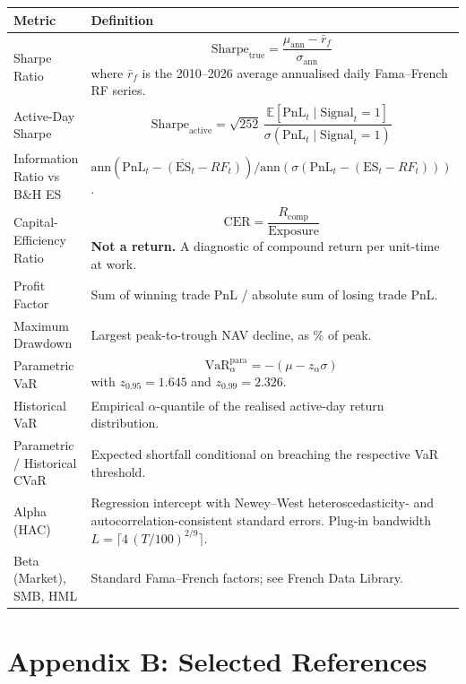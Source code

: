 \documentclass[11pt]{article}
\begin{document}
\begin{center}
\small
\begin{tabular}{p{} p{}}
\toprule
\textbf{Metric} & \textbf{Definition}\\
\midrule
Sharpe Ratio &
\[
\mathrm{Sharpe}_{\mathrm{true}}
= \frac{\mu_{\mathrm{ann}} - \bar r_f}{\sigma_{\mathrm{ann}}}
\]
where $\bar r_f$ is the 2010--2026 average annualised daily
Fama--French RF series.\\
Active-Day Sharpe &
\[
\mathrm{Sharpe}_{\mathrm{active}}
= \sqrt{252}\,
\frac{\mathbb{E}\!\left[\text{PnL}_t \mid \text{Signal}_t = 1\right]}
{\sigma\!\left(\text{PnL}_t \mid \text{Signal}_t = 1\right)}
\]\\
Information Ratio vs B\&H ES &
$\mathrm{ann}(\overline{\text{PnL}_t - (\text{ES}_t - RF_t)}) /
 \mathrm{ann}(\sigma(\text{PnL}_t - (\text{ES}_t - RF_t)))$.\\
Capital-Efficiency Ratio &
\[
\mathrm{CER} = \frac{R_{\mathrm{comp}}}{\mathrm{Exposure}}
\]
\textbf{Not a return.} A diagnostic of compound return per unit-time at
work.\\
Profit Factor &
Sum of winning trade PnL / absolute sum of losing trade PnL.\\
Maximum Drawdown &
Largest peak-to-trough NAV decline, as \% of peak.\\
Parametric VaR &
\[
\mathrm{VaR}^{\mathrm{para}}_{\alpha} = -(\mu - z_{\alpha}\sigma)
\]
with $z_{0.95} = 1.645$ and $z_{0.99} = 2.326$.\\
Historical VaR &
Empirical $\alpha$-quantile of the realised active-day return distribution.\\
Parametric / Historical CVaR &
Expected shortfall conditional on breaching the respective VaR threshold.\\
Alpha (HAC) &
Regression intercept with Newey--West heteroscedasticity- and
autocorrelation-consistent standard errors. Plug-in bandwidth
$L = \lceil 4\,(T/100)^{2/9}\rceil$.\\
Beta (Market), SMB, HML &
Standard Fama--French factors; see French Data Library.\\
\bottomrule
\end{tabular}
\end{center}
\newpage
\section*{Appendix B: Selected References}
\end{document}
